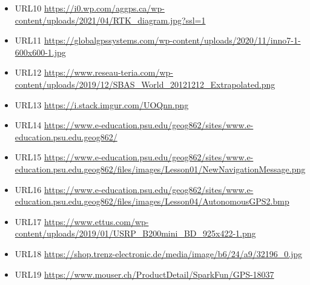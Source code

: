 \begin{itemize}
	\item URL10 \href{https://i0.wp.com/aggps.ca/wp-content/uploads/2021/04/RTK_diagram.jpg?ssl=1}{\url{https://i0.wp.com/aggps.ca/wp-content/uploads/2021/04/RTK_diagram.jpg?ssl=1}}

	\item URL11 \href{https://globalgpssystems.com/wp-content/uploads/2020/11/inno7-1-600x600-1.jpg}{https://globalgpssystems.com/wp-content/uploads/2020/11/inno7-1-600x600-1.jpg}

	\item URL12 \href{https://www.reseau-teria.com/wp-content/uploads/2019/12/SBAS_World_20121212_Extrapolated.png}{\url{https://www.reseau-teria.com/wp-content/uploads/2019/12/SBAS_World_20121212_Extrapolated.png}}

	\item URL13 \href{https://i.stack.imgur.com/UOQnn.png}{\url{https://i.stack.imgur.com/UOQnn.png}}

	\item URL14 \href{https://www.e-education.psu.edu/geog862/sites/www.e-education.psu.edu.geog862/}{\url{https://www.e-education.psu.edu/geog862/sites/www.e-education.psu.edu.geog862/}}

	\item URL15 \href{https://www.e-education.psu.edu/geog862/sites/www.e-education.psu.edu.geog862/files/images/Lesson01/NewNavigationMessage.png}{\url{https://www.e-education.psu.edu/geog862/sites/www.e-education.psu.edu.geog862/files/images/Lesson01/NewNavigationMessage.png}}

	\item URL16 \href{https://www.e-education.psu.edu/geog862/sites/www.e-education.psu.edu.geog862/files/images/Lesson04/AutonomousGPS2.bmp}{\url{https://www.e-education.psu.edu/geog862/sites/www.e-education.psu.edu.geog862/files/images/Lesson04/AutonomousGPS2.bmp}}

	\item URL17 \href{https://www.ettus.com/wp-content/uploads/2019/01/USRP_B200mini_BD_925x422-1.png}{\url{https://www.ettus.com/wp-content/uploads/2019/01/USRP_B200mini_BD_925x422-1.png}}

	\item URL18 \href{https://shop.trenz-electronic.de/media/image/b6/24/a9/32196_0.jpg}{\url{https://shop.trenz-electronic.de/media/image/b6/24/a9/32196_0.jpg}}

	\item URL19 \href{https://www.mouser.ch/ProductDetail/SparkFun/GPS-18037}{\url{https://www.mouser.ch/ProductDetail/SparkFun/GPS-18037}}


\end{itemize}
